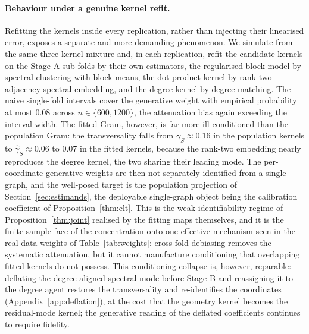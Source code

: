 \documentclass[12pt]{article}
\newcommand{\1}{\mathbf{1}}
\begin{document}
\paragraph{Behaviour under a genuine kernel refit.}
Refitting the kernels inside every replication, rather than injecting their linearised error, exposes
a separate and more demanding phenomenon. We simulate from the same three-kernel mixture and, in each
replication, refit the candidate kernels on the Stage-A sub-folds by their own estimators, the
regularised block model by spectral clustering with block means, the dot-product kernel by
rank-two adjacency spectral embedding, and the degree kernel by degree matching. The naive
single-fold intervals cover the generative weight with empirical probability at most $0.08$ across
$n\in\{600,1200\}$, the attenuation bias again exceeding the interval width. The fitted Gram, however,
is far more ill-conditioned than the population Gram: the transversality falls from
$\gamma_S\approx0.16$ in the population kernels to $\widehat\gamma_S\approx0.06$ to $0.07$ in the
fitted kernels, because the rank-two embedding nearly reproduces the degree kernel, the two sharing
their leading mode. The per-coordinate generative weights are then not separately identified from a
single graph, and the well-posed target is the population projection of
Section~\ref{sec:estimands}, the deployable single-graph object being the calibration coefficient of
Proposition~\ref{thm:clt}. This is the weak-identifiability regime of Proposition~\ref{thm:joint}
realised by the fitting maps themselves, and it is the finite-sample face of the concentration onto
one effective mechanism seen in the real-data weights of Table~\ref{tab:weights}: cross-fold
debiasing removes the systematic attenuation, but it cannot manufacture conditioning that overlapping
fitted kernels do not possess. This conditioning collapse is, however, reparable: deflating the
degree-aligned spectral mode before Stage B and reassigning it to the degree agent restores the
transversality and re-identifies the coordinates (Appendix~\ref{app:deflation}), at the cost that the
geometry kernel becomes the residual-mode kernel; the generative reading of the deflated coefficients
continues to require fidelity.
\end{document}
